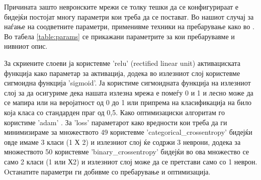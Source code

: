 Причината зашто невронските мрежи се толку тешки да се конфигурираат е бидејќи постојат многу параметри кои треба да се постават. Во нашиот случај за наѓање на соодветните параметри, применивме техники на пребарување како во \cite{lameski2015svm}. Во табела \ref{table:params} се прикажани параметрите за кои пребарувавме и нивниот опис. 

\begin{table}[hbtp]
 \centering
\caption{Параметри за конфигурација на модел на невронски мрежи во Керас}
\label{table:params}
\end{table}
За скриените слоеви ја користевме 'relu' (rectified linear unit) активациската функција како параметар за активација, додека во излезниот слој користевме сигмоидна функција 'sigmoid'. 
Ја користиме сигмоидната функција на излезниот слој за да осигуриме дека нашата излезна мрежа е помеѓу 0 и 1 и лесно може да се мапира или на веројатност од 0 до 1 или припрема на класификација на било која класа со стандарден праг од 0,5. Како оптимизациски алгоритам го користиме 'adam' \cite{kingma2014adam}. За 'loss' параметарот како вредности кои треба да ги минимизираме за множеството 49 користевме 'categorical\_crossentropy' бидејќи овде имаме 3 класи (1 Х 2) и излезниот слој ќе содржи 3 неврони, додека за множеството 50 користевме 'binary\_crossentropy' бидејќи во ова множество се само 2 класи (1 или Х2) и излезниот слој може да се претстави само со 1 неврон. Oстанатите параметри ги добивме со пребарување и оптимизација.

